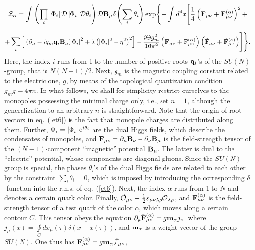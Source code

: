 \documentclass[a4paper,12pt]{article}
\begin{document}
$$
{\cal Z}_\alpha=\int\left(\prod\limits_{i}^{} \left|\Phi_i\right| {\cal D}\left|\Phi_i\right|
{\cal D}\theta_i\right) {\cal D}{\bf B}_\mu
\delta\left(\sum\limits_{i}^{}
\theta_i\right)\exp\Biggl\{-\int d^4x\Biggl[\frac14\left({\bf F}_{\mu\nu}+{\bf F}_{\mu\nu}^{(\alpha)}\right)^2+$$

\begin{equation}
\label{et6}
+\sum\limits_{i}^{}\left[\left|\left(\partial_\mu-
ig_m{\bf q}_i{\bf B}_\mu\right)\Phi_i\right|^2+
\lambda\left(|\Phi_i|^2-\eta^2\right)^2\right]-\frac{i\Theta g_m^2}{16\pi^2}
\left({\bf F}_{\mu\nu}+{\bf F}_{\mu\nu}^{(\alpha)}\right)
\left(\tilde{\bf F}_{\mu\nu}+\tilde{\bf F}_{\mu\nu}^{(\alpha)}\right)
\Biggr]\Biggr\}.
\end{equation}
Here, the index $i$ runs from 1 to the number of positive roots ${\bf q}_i$'s of the $SU(N)$-group, that is $N(N-1)/2$.
Next, $g_m$ is the magnetic
coupling constant related to the
electric one, $g$, by means of the topological
quantization condition $g_mg=4\pi n$. In what follows,
we shall for simplicity restrict ourselves to the monopoles
possessing the minimal charge only, i.e., set $n=1$, although the generalization to an
arbitrary $n$ is straightforward.
Note that the origin of root vectors in eq.~(\ref{et6}) is the fact that
monopole charges are distributed along them. Further,
$\Phi_i=\left|\Phi_i\right|{\rm e}^{i\theta_i}$ are the
dual Higgs fields, which describe the condensates of monopoles, and
${\bf F}_{\mu\nu}=\partial_\mu{\bf B}_\nu-\partial_\nu{\bf B}_\mu$ is the
field-strength tensor of the
$(N-1)$-component ``magnetic'' potential ${\bf B}_\mu$. The latter is dual
to the ``electric'' potential, whose components are diagonal gluons.
Since the $SU(N)$-group is special, the phases $\theta_i$'s of the
dual Higgs fields are related to each other by the constraint
$\sum\limits_{i}^{}\theta_i=0$, which is imposed by introducing
the corresponding $\delta$-function into the r.h.s. of eq.~(\ref{et6}).
Next, the index $\alpha$ runs from 1 to $N$ and denotes a certain quark color.
Finally, $\tilde {\cal O}_{\mu\nu}\equiv\frac12\varepsilon_{\mu\nu\lambda\rho}
{\cal O}_{\lambda\rho}$, and
${\bf F}_{\mu\nu}^{(\alpha)}$ is the field-strength tensor
of a test quark of the color $\alpha$, which moves along a certain
contour $C$. This tensor obeys the equation
$\partial_\mu\tilde {\bf F}_{\mu\nu}^{(\alpha)}=g{\bf m}_\alpha j_\nu$,
where $j_\mu(x)=\oint\limits_{C}^{}dx_\mu(\tau)\delta(x-x(\tau))$,
and ${\bf m}_\alpha$ is a weight vector of the group $SU(N)$.
One thus has ${\bf F}_{\mu\nu}^{(\alpha)}=g{\bf m}_\alpha\tilde{\cal F}_{\mu\nu}$,
\end{document}
